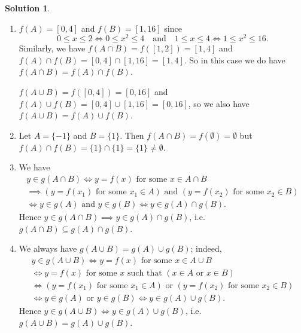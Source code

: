 \documentclass[12pt]{article}
\theoremstyle{definition}
\theoremstyle{exercise}
\theoremstyle{solution}
\newtheorem*{solution}{Solution}
\begin{document}
\begin{solution}
    \begin{enumerate}[label = (\alph*)]
        \item \( f(A) = [0, 4] \) and \( f(B) = [1, 16] \) since
        \[
            0 \leq x \leq 2 \iff 0 \leq x^2 \leq 4 \quad \text{and} \quad 1 \leq x \leq 4 \iff 1 \leq x^2 \leq 16.
        \]
        Similarly, we have \( f(A \cap B) = f([1, 2]) = [1, 4] \) and \( f(A) \cap f(B) = [0, 4] \cap [1, 16] = [1, 4] \). So in this case we do have \( f(A \cap B) = f(A) \cap f(B) \).
    
        \( f(A \cup B) = f([0, 4]) = [0, 16] \) and \( f(A) \cup f(B) = [0, 4] \cup [1, 16] = [0, 16] \), so we also have \( f(A \cup B) = f(A) \cup f(B) \).
    
        \item Let \( A = \{ -1 \} \) and \( B = \{ 1 \} \). Then \( f(A \cap B) = f(\emptyset) = \emptyset \) but \( f(A) \cap f(B) = \{ 1 \} \cap \{ 1 \} = \{ 1 \} \neq \emptyset \).

        \item We have
        \begin{gather*}
            y \in g(A \cap B) \iff y = f(x) \text{ for some } x \in A \cap B \\
            \implies (y = f(x_1) \text{ for some } x_1 \in A) \text{ and } (y = f(x_2) \text{ for some } x_2 \in B) \\
            \iff y \in g(A) \text{ and } y \in g(B) \iff y \in g(A) \cap g(B).
        \end{gather*}
        Hence \( y \in g(A \cap B) \implies y \in g(A) \cap g(B) \), i.e.\ \( g(A \cap B) \subseteq g(A) \cap g(B) \).

        \item We always have \( g(A \cup B) = g(A) \cup g(B) \); indeed,
        \begin{gather*}
            y \in g(A \cup B) \iff y = f(x) \text{ for some } x \in A \cup B \\
            \iff y = f(x) \text{ for some } x \text{ such that } (x \in A \text{ or } x \in B) \\
            \iff (y = f(x_1) \text{ for some } x_1 \in A) \text{ or } (y = f(x_2) \text{ for some } x_2 \in B) \\
            \iff y \in g(A) \text{ or } y \in g(B) \iff y \in g(A) \cup g(B).
        \end{gather*}
        Hence \( y \in g(A \cup B) \iff y \in g(A) \cup g(B) \), i.e.\ \( g(A \cup B) = g(A) \cup g(B) \).
    \end{enumerate}
\end{solution}
\end{document}
